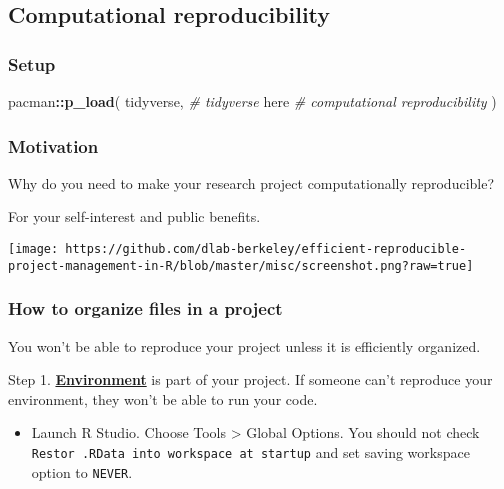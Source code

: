 \documentclass[
]{book}
\newenvironment{Shaded}{\begin{snugshade}}{\end{snugshade}}
\newcommand{\CommentTok}[1]{\textcolor[rgb]{0.56,0.35,0.01}{\textit{#1}}}
\newcommand{\KeywordTok}[1]{\textcolor[rgb]{0.13,0.29,0.53}{\textbf{#1}}}
\newcommand{\NormalTok}[1]{#1}
\newcommand{\OperatorTok}[1]{\textcolor[rgb]{0.81,0.36,0.00}{\textbf{#1}}}
\providecommand{\tightlist}{%
  \setlength{\itemsep}{0pt}\setlength{\parskip}{0pt}}
\begin{document}
\hypertarget{computational-reproducibility}{%
\subsection{Computational reproducibility}\label{computational-reproducibility}}

\hypertarget{setup}{%
\subsubsection{Setup}\label{setup}}

\begin{Shaded}
\begin{Highlighting}[]
\NormalTok{pacman}\OperatorTok{::}\KeywordTok{p\_load}\NormalTok{(}
\NormalTok{  tidyverse, }\CommentTok{\# tidyverse}
\NormalTok{  here }\CommentTok{\# computational reproducibility}
\NormalTok{)}
\end{Highlighting}
\end{Shaded}

\hypertarget{motivation}{%
\subsubsection{Motivation}\label{motivation}}

Why do you need to make your research project computationally reproducible?

For your self-interest and public benefits.

\texttt{[image: https://github.com/dlab-berkeley/efficient-reproducible-project-management-in-R/blob/master/misc/screenshot.png?raw=true]}

\hypertarget{how-to-organize-files-in-a-project}{%
\subsubsection{How to organize files in a project}\label{how-to-organize-files-in-a-project}}

You won't be able to reproduce your project unless it is efficiently organized.

Step 1. \href{https://environments.rstudio.com/}{\textbf{Environment}} is part of your project. If someone can't reproduce your environment, they won't be able to run your code.

\begin{itemize}
\tightlist
\item
  Launch R Studio. Choose Tools \textgreater{} Global Options. You should not check \texttt{Restor\ .RData\ into\ workspace\ at\ startup} and set saving workspace option to \texttt{NEVER}.
\end{itemize}
\end{document}
